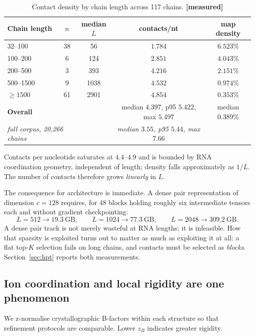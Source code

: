 \documentclass[11pt,a4paper]{article}
\newcommand{\meas}{\textcolor{measured}{\textbf{[measured]}}}
\begin{document}
\begin{table}[h]
\centering
\caption{Contact density by chain length across 117 chains. \meas}
\label{tab:sparsity}
\begin{tabular}{lcccc}
\toprule
\textbf{Chain length} & \textbf{$n$} & \textbf{median $L$} & \textbf{contacts/nt} & \textbf{map density} \\
\midrule
32--100    & 38 & 56   & $1.784$ & $6.523\%$ \\
100--200   & 6  & 124  & $2.851$ & $4.043\%$ \\
200--500   & 3  & 393  & $4.216$ & $2.151\%$ \\
500--1500  & 9  & 1038 & $4.532$ & $0.974\%$ \\
$\geq 1500$ & 61 & 2901 & $4.854$ & $\mathbf{0.353\%}$ \\
\midrule
\multicolumn{2}{l}{\textbf{Overall}} & & median $4.397$, p95 $5.422$, max $5.497$ & median $0.389\%$ \\
\multicolumn{2}{l}{\emph{full corpus, 20{,}266 chains}} & & \emph{median $3.55$, p95 $5.44$, max $\mathbf{7.66}$} & \\
\bottomrule
\end{tabular}
\end{table}

Contacts per nucleotide saturates at $4.4$--$4.9$ and is bounded by RNA
coordination geometry, independent of length; density falls approximately as
$1/L$. The number of contacts therefore grows \emph{linearly} in $L$.

The consequence for architecture is immediate. A dense pair representation of
dimension $c=128$ requires, for 48 blocks holding roughly six intermediate
tensors each and without gradient checkpointing:
\[
L=512 \rightarrow 19.3~\text{GB}, \qquad
L=1024 \rightarrow 77.3~\text{GB}, \qquad
L=2048 \rightarrow 309.2~\text{GB}.
\]
A dense pair track is not merely wasteful at RNA lengths; it is infeasible.
How that sparsity is exploited turns out to matter as much as exploiting it at
all: a flat top-$K$ selection fails on long chains, and contacts must be
selected as \emph{blocks}. Section~\ref{sec:hpt} reports both measurements.

\subsection{Ion coordination and local rigidity are one phenomenon}

We z-normalise crystallographic B-factors within each structure so that
refinement protocols are comparable. Lower $z_B$ indicates greater rigidity.
\end{document}
